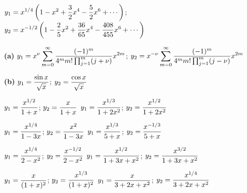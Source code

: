$y_{1}=\displaystyle{x^{1/4}\left(1-x^{2}+\frac{3}{2}x^{4}-\frac{5}{2}x^{6}
+\cdots\right)}$; \,
$y_{2}=\displaystyle{x^{-1/2}\left(1-\frac{2}{5}x^{2}+\frac{36}{65}x^{4}-
\frac{408}{455}x^{6}+\cdots\right)}$

{\bf (a)}
$y_{1}=\displaystyle{x^{\nu}\sum_{m=0}^{\infty}\frac{(-1)^{m}}{4^{m}m!\prod_{j=1}^{m}(j+\nu)}x^{2m}}$;
$y_{2}=\displaystyle{x^{-\nu}\sum_{m=0}^{\infty}\frac{(-1)^{m}}{4^{m}m!\prod_{j=1}^{m}(j-\nu)}x^{2m}}$

\quad\;  \;
{\bf (b)} $y_{1}=\displaystyle\frac{\sin x}{\sqrt{x}}$;   $y_{2}=\displaystyle\frac{\cos x}{\sqrt{x}}$

$y_{1}=\displaystyle\frac{x^{1/2}}{1+x}$;   $y_{2}=\displaystyle\frac{x}{1+x}$
$y_{1}=\displaystyle\frac{x^{1/3}}{1+2x^{2}}$;   $y_{2}=\displaystyle\frac{x^{1/2}}{1+2x^{2}}$

$y_{1}=\displaystyle\frac{x^{1/4}}{1-3x}$;   $y_{2}=\displaystyle\frac{x^{2}}{1-3x}$
$y_{1}=\displaystyle\frac{x^{1/3}}{5+x}$;   $y_{2}=\displaystyle\frac{x^{-1/3}}{5+x}$

$y_{1}=\displaystyle\frac{x^{1/4}}{2-x^{2}}$;   $y_{2}=\displaystyle\frac{x^{-1/2}}{2-x^{2}}$
$y_{1}=\displaystyle\frac{x^{1/2}}{1+3x+x^{2}}$;    $y_{2}=\displaystyle\frac{x^{3/2}}{1+3x+x^{2}}$

$y_{1}=\displaystyle\frac{x}{(1+x)^{2}}$;   $y_{2}=\displaystyle\frac{x^{1/3}}{(1+x)^{2}}$
$y_{1}=\displaystyle\frac{x}{3+2x+x^{2}}$;   $y_{2}=\displaystyle\frac{x^{1/4}}{3+2x+x^{2}}$

